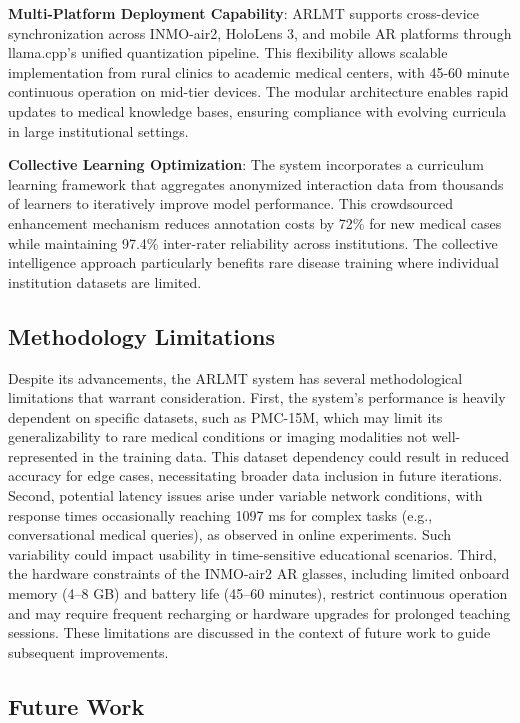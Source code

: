 \documentclass[10pt,letterpaper]{article}
\begin{document}
\textbf{Multi-Platform Deployment Capability}: ARLMT supports cross-device synchronization across INMO-air2, HoloLens 3, and mobile AR platforms through llama.cpp's unified quantization pipeline. This flexibility allows scalable implementation from rural clinics to academic medical centers, with 45-60 minute continuous operation on mid-tier devices. The modular architecture enables rapid updates to medical knowledge bases, ensuring compliance with evolving curricula in large institutional settings.

\textbf{Collective Learning Optimization}: The system incorporates a curriculum learning framework that aggregates anonymized interaction data from thousands of learners to iteratively improve model performance. This crowdsourced enhancement mechanism reduces annotation costs by 72\% for new medical cases while maintaining 97.4\% inter-rater reliability across institutions. The collective intelligence approach particularly benefits rare disease training where individual institution datasets are limited.

\subsection*{Methodology Limitations}

Despite its advancements, the ARLMT system has several methodological limitations that warrant consideration. First, the system’s performance is heavily dependent on specific datasets, such as PMC-15M, which may limit its generalizability to rare medical conditions or imaging modalities not well-represented in the training data. This dataset dependency could result in reduced accuracy for edge cases, necessitating broader data inclusion in future iterations. Second, potential latency issues arise under variable network conditions, with response times occasionally reaching 1097 ms for complex tasks (e.g., conversational medical queries), as observed in online experiments. Such variability could impact usability in time-sensitive educational scenarios. Third, the hardware constraints of the INMO-air2 AR glasses, including limited onboard memory (4–8 GB) and battery life (45–60 minutes), restrict continuous operation and may require frequent recharging or hardware upgrades for prolonged teaching sessions. These limitations are discussed in the context of future work to guide subsequent improvements.

\subsection*{Future Work}
\end{document}
